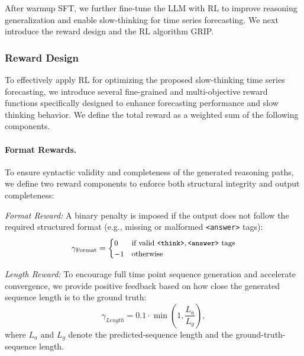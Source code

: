 After warmup SFT, we further fine-tune the LLM with RL to improve reasoning generalization and enable slow-thinking for time series forecasting. We next introduce the reward design and the RL algorithm GRIP.


\subsubsection{Reward Design}
\label{sec:Reward Modeling}
To effectively apply RL for optimizing the proposed slow-thinking time series forecasting, we introduce several fine-grained and multi-objective reward functions specifically designed to enhance forecasting performance and slow thinking behavior. We define the total reward as a weighted sum of the following components.


\paragraph{Format Rewards.}  
To ensure syntactic validity and completeness of the generated reasoning paths, we define two reward components to enforce both structural integrity and output completeness:

\textit{Format Reward:} A binary penalty is imposed if the output does not follow the required structured format (e.g., missing or malformed \texttt{<answer>} tags):
{
\setlength{\abovedisplayskip}{5pt}
\setlength{\belowdisplayskip}{5pt}
\begin{equation}
\small
\gamma_{\text{Format}} = 
\begin{cases}
0 & \text{if valid } \texttt{<think>}, \texttt{<answer>} \text{ tags} \\
-1 & \text{otherwise}
\end{cases}
\end{equation}
}

\textit{Length Reward:} To encourage full time point sequence generation and accelerate convergence, we provide positive feedback based on how close the generated sequence length is to the ground truth:
{\setlength{\abovedisplayskip}{5pt}
\setlength{\belowdisplayskip}{5pt}
\begin{equation}
\gamma_{Length} = 0.1 \cdot \min \left( 1, \frac{L_a}{L_g} \right),
\end{equation}
}
where $L_a$ and $L_g$ denote the predicted-sequence length and the ground-truth-sequence length.

